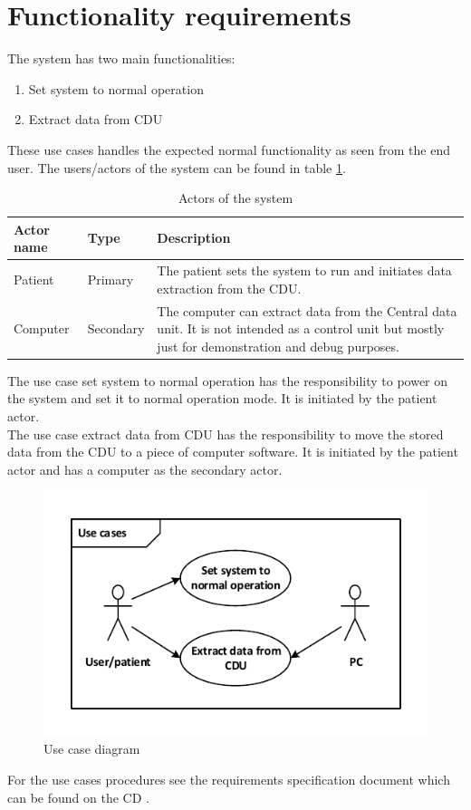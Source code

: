 \section{Functionality requirements}
The system has two main functionalities:
\begin{enumerate}
	\item Set system to normal operation
	\item Extract data from CDU
\end{enumerate}
These use cases handles the expected normal functionality as seen from the end user. The users/actors of the system can be found in table \ref{tab:actors}.
\begin{table}[H]
	\centering
	\begin{tabular}{|l|l|p{9.5cm}|}
	\hline
	Actor name & Type & Description \\ \hline
	Patient & Primary & The patient sets the system to run and initiates data extraction from the CDU. \\ \hline
	Computer & Secondary  & The computer can extract data from the Central data unit. It is not intended as a control unit but mostly just for demonstration and debug purposes.\\ \hline
	\end{tabular}
	\caption{Actors of the system}
	\label{tab:actors}
\end{table}
The use case set system to normal operation has the responsibility to power on the system and set it to normal operation mode. It is initiated by the patient actor.\\
The use case extract data from CDU has the responsibility to move the stored data from the CDU to a piece of computer software. It is initiated by the patient actor and has a computer as the secondary actor. 
\begin{figure}[H]
	\centering
	\includegraphics[width=.7\textwidth]{billeder/7requirementspec/usecase_vector}
	\caption{Use case diagram}
\end{figure}
For the use cases procedures see the requirements specification document which can be found on the CD \cite{cd}.
